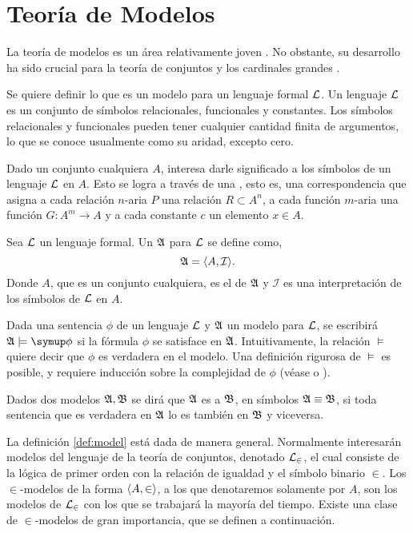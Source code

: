 \section{Teoría de Modelos}
\label{sec:models}

La teoría de modelos es un área relativamente joven \autocite[3]{chang_model_2012}.
No obstante, su desarrollo ha sido crucial para la teoría de conjuntos y los
cardinales grandes \autocite[xv]{kanamori_higher_2009}.

Se quiere definir lo que es un modelo para un lenguaje formal $\mathcal { L }$.
Un lenguaje $\mathcal { L }$ es un conjunto de símbolos relacionales, funcionales y constantes.
Los símbolos relacionales y funcionales pueden tener cualquier cantidad finita de argumentos,
lo que se conoce usualmente como su aridad, excepto cero.

Dado un conjunto cualquiera $A$, interesa darle significado a los símbolos de un
lenguaje $\mathcal { L }$ en $A$. Esto se logra a través de una , esto es,
una correspondencia que asigna a cada relación $n$-aria $P$ una relación
$R\subset A^n$, a cada función $m$-aria una función $G\colon A^m\to A$ y a cada
constante $c$ un elemento $x\in A$.

\begin{defi}\label{def:model}
    Sea $\mathcal { L }$ un lenguaje formal. Un  $\mathfrak { A }$ para $\mathcal { L }$ se define como,
    \[
        \mathfrak { A } = \langle A, \mathcal{I} \rangle.
    \]
    Donde $A$, que es un conjunto cualquiera, es el  de $\mathfrak { A }$ y
    $\mathcal{I}$ es una interpretación de los símbolos de $\mathcal { L }$ en $A$.
\end{defi}

Dada una sentencia $\phi$ de un lenguaje $\mathcal { L }$ y $\mathfrak { A }$ un modelo para $\mathcal { L }$,
se escribirá $\model{A}\models\phi$ si la fórmula $\phi$ se satisface en $\mathfrak { A }$.
Intuitivamente, la relación $\models$ quiere decir que $\phi$ es verdadera en el modelo.
Una definición rigurosa de $\models$ es posible, y requiere inducción sobre la complejidad
de $\phi$ (véase \autocite[\S 1.3]{chang_model_2012} o \autocite[\S 12]{jech_set_2003}).

Dados dos modelos $\mathfrak { A }, \mathfrak { B }$ se dirá que $\mathfrak { A }$ es  a $\mathfrak { B }$, en símbolos $\mathfrak { A }\equiv \mathfrak { B }$, si toda sentencia
que es verdadera en $\mathfrak { A }$ lo es también en $\mathfrak { B }$ y viceversa.

La definición \ref{def:model} está dada de manera general. Normalmente interesarán modelos
del lenguaje de la teoría de conjuntos, denotado $\mathcal { L }_\in$, el cual consiste de la lógica de
primer orden con la relación de igualdad y el símbolo binario $\in$.
Los $\in$-modelos de la forma $\langle A,\in \rangle$, a los que denotaremos
solamente por $A$, son los modelos de $\mathcal { L }_\in$ con los que se trabajará la mayoría del tiempo.
Existe una clase de $\in$-modelos de gran importancia, que se definen a continuación.

